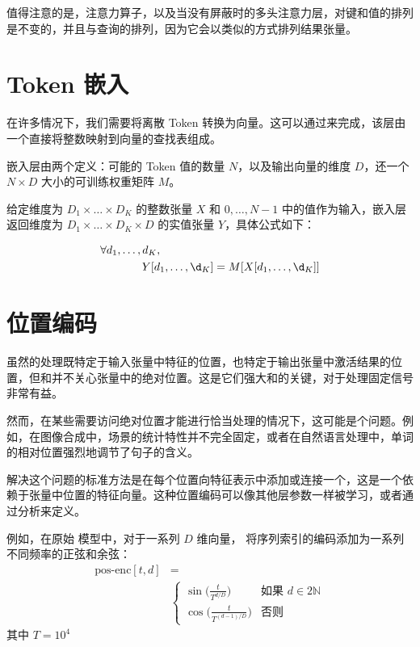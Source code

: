 值得注意的是，注意力算子，以及当没有屏蔽时的多头注意力层，对键和值的排列是不变的，并且与查询的排列，因为它会以类似的方式排列结果张量。

\section{Token 嵌入}\label{sec4.9}

在许多情况下，我们需要将离散 Token 转换为向量。这可以通过来完成，该层由一个直接将整数映射到向量的查找表组成。

嵌入层由两个定义：可能的 Token 值的数量 $N$，以及输出向量的维度 $D$，还一个 $N \times D$ 大小的可训练权重矩阵 $M$。

给定维度为 $D_1 \times \dots \times D_K$ 的整数张量 $X$ 和 ${0, \dots ,N -1}$ 中的值作为输入，嵌入层返回维度为 $D_1 \times \dots \times D_K \times D$ 的实值张量 $Y$，具体公式如下：

\begin{align*}
    \forall d_1, \dots, d_K,& \\
    Y[d&_1, \dots, \d_K] = M[X[d_1, \dots, \d_K]]
\end{align*}

\section{位置编码}\label{sec4.10}

虽然的处理既特定于输入张量中特征的位置，也特定于输出张量中激活结果的位置，但和并不关心张量中的绝对位置。这是它们强大和的关键，对于处理固定信号非常有益。

然而，在某些需要访问绝对位置才能进行恰当处理的情况下，这可能是个问题。例如，在图像合成中，场景的统计特性并不完全固定，或者在自然语言处理中，单词的相对位置强烈地调节了句子的含义。

解决这个问题的标准方法是在每个位置向特征表示中添加或连接一个，这是一个依赖于张量中位置的特征向量。这种位置编码可以像其他层参数一样被学习，或者通过分析来定义。

例如，在原始  模型中，对于一系列 $D$ 维向量，\cite{arxiv-1706.03762} 将序列索引的编码添加为一系列不同频率的正弦和余弦：
\begin{align*}
    \text{pos-enc}[t,d] &= \\
    &\begin{cases}
        \sin\Big(\frac{t}{T^{d/D}}\Big) &\text{如果 } d \in 2\mathbb{N}\\
        \cos\Big(\frac{t}{T^{(d-1)/D}}\Big) &\text{否则}
    \end{cases}
\end{align*}
其中 $T= 10^4$